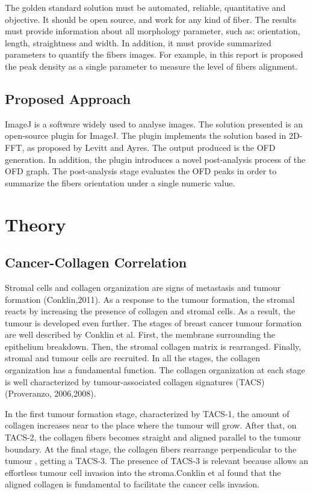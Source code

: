 \documentclass[12pt,a4paper]{article}
\begin{document}
The golden standard solution must be automated, reliable, quantitative and objective. It should be open source, and work for any kind of fiber.  The results must provide information about all morphology parameter, such as: orientation, length, straightness and width. In addition, it must provide summarized parameters to quantify the fibers images. For example, in this report is proposed the peak density as a single parameter to measure the level of fibers alignment.
\subsection{Proposed Approach}
ImageJ is a software widely used to analyse images. The solution presented is an open-source plugin for ImageJ.  The plugin implements the solution based in 2D-FFT, as proposed by Levitt and Ayres.  The output produced is the OFD generation. In addition, the plugin introduces a novel post-analysis process of the OFD graph. The post-analysis stage evaluates the OFD peaks in order to summarize the fibers orientation under a single numeric value.
\section{Theory}
\subsection{Cancer-Collagen Correlation}
Stromal cells and collagen organization are signs of metastasis and tumour formation (Conklin,2011). As a response to the tumour formation, the stromal reacts by increasing the presence of collagen and stromal cells. As a result, the tumour is developed even further.  The stages of breast cancer tumour formation are well described by Conklin et al. First, the membrane surrounding the epithelium breakdown. Then, the stromal collagen matrix is rearranged. Finally, stromal and tumour cells are recruited. In all the stages, the collagen organization has a fundamental function. The collagen organization at each stage is well characterized by tumour-associated collagen signatures (TACS) (Proveranzo, 2006,2008).

In the first tumour formation stage, characterized by TACS-1, the amount of collagen increases near to the place where the tumour will grow. After that, on TACS-2, the collagen fibers becomes straight and aligned parallel to the tumour boundary.  At the final stage, the collagen fibers rearrange perpendicular to the tumour , getting a TACS-3. The presence of TACS-3 is relevant because allows an effortless tumour cell invasion into the stroma.Conklin et al found that the aligned collagen is fundamental to facilitate the cancer cells invasion. 
\end{document}

